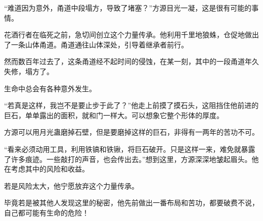 \begin{this_body}
“难道因为意外，甬道中段塌方，导致了堵塞？”方源目光一凝，这是很有可能的事情。

花酒行者在临死之前，急切间创立这个力量传承。他利用千里地狼蛛，仓促地做出了一条山体甬道。甬道通往山体深处，引导着继承者前行。

然而数百年过去了，这条甬道经不起时间的侵蚀，在某一刻，其中的一段甬道年久失修，塌方了。

生命中总会有各种意外发生。

“若真是这样，我岂不是要止步于此了？”他走上前摸了摸石头，这阻挡住他前进的巨石，单单露出的面积，就和门一样大。可以想象它整个形体的厚度。

方源可以用月光蛊磨掉石壁，但是要磨掉这样的巨石，非得有一两年的苦功不可。

“看来必须动用工具，利用铁镐和铁锹，将巨石破开。只是这样一来，难免就暴露了许多痕迹。一些敲打的声音，也会传出去。”想到这里，方源深深地皱起眉头。他在考虑其中的风险和收益。

若是风险太大，他宁愿放弃这个力量传承。

毕竟若是被其他人发现这里的秘密，他先前做出一番布局和苦功，都要破费不说，自己都可能有生命的危险！

\end{this_body}

